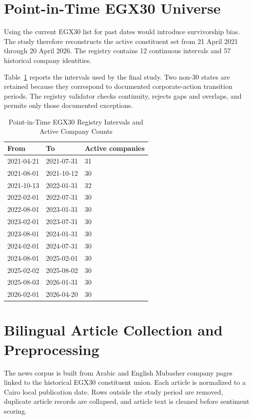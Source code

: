 \section{Point-in-Time EGX30 Universe}

Using the current EGX30 list for past dates would introduce survivorship bias. The study therefore reconstructs the active constituent set from 21 April 2021 through 20 April 2026. The registry contains 12 continuous intervals and 57 historical company identities.

Table~\ref{tab:pit_registry} reports the intervals used by the final study. Two non-30 states are retained because they correspond to documented corporate-action transition periods. The registry validator checks continuity, rejects gaps and overlaps, and permits only those documented exceptions.

\begin{table}[ht]
\centering
\caption{Point-in-Time EGX30 Registry Intervals and Active Company Counts}
\label{tab:pit_registry}
\small
\begin{tabular}{lll}
\toprule
From & To & Active companies \\
\midrule
2021-04-21 & 2021-07-31 & 31 \\
2021-08-01 & 2021-10-12 & 30 \\
2021-10-13 & 2022-01-31 & 32 \\
2022-02-01 & 2022-07-31 & 30 \\
2022-08-01 & 2023-01-31 & 30 \\
2023-02-01 & 2023-07-31 & 30 \\
2023-08-01 & 2024-01-31 & 30 \\
2024-02-01 & 2024-07-31 & 30 \\
2024-08-01 & 2025-02-01 & 30 \\
2025-02-02 & 2025-08-02 & 30 \\
2025-08-03 & 2026-01-31 & 30 \\
2026-02-01 & 2026-04-20 & 30 \\
\bottomrule
\end{tabular}
\end{table}

\section{Bilingual Article Collection and Preprocessing}

The news corpus is built from Arabic and English Mubasher company pages linked to the historical EGX30 constituent union. Each article is normalized to a Cairo local publication date. Rows outside the study period are removed, duplicate article records are collapsed, and article text is cleaned before sentiment scoring.

